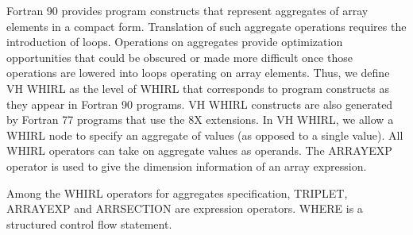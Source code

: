 Fortran 90 provides program constructs that represent aggregates
of array elements in a compact form. Translation of such aggregate
operations requires the introduction of loops. Operations on
aggregates provide optimization opportunities that could be obscured
or made more difficult once those operations are lowered into loops
operating on array elements. Thus, we define VH WHIRL as the level
of WHIRL that corresponds to program constructs as they appear in
Fortran 90 programs. VH WHIRL constructs are also generated by
Fortran 77 programs that use the 8X extensions. In VH WHIRL, we
allow a WHIRL node to specify an aggregate of values (as opposed
to a single value). All WHIRL operators can take on aggregate values
as operands. The
%
ARRAYEXP operator is used to give the dimension
information of an array expression.

Among the WHIRL operators for aggregates specification,
%
TRIPLET,
%
ARRAYEXP and
%
ARRSECTION are expression operators. WHERE is a
structured control flow statement.

